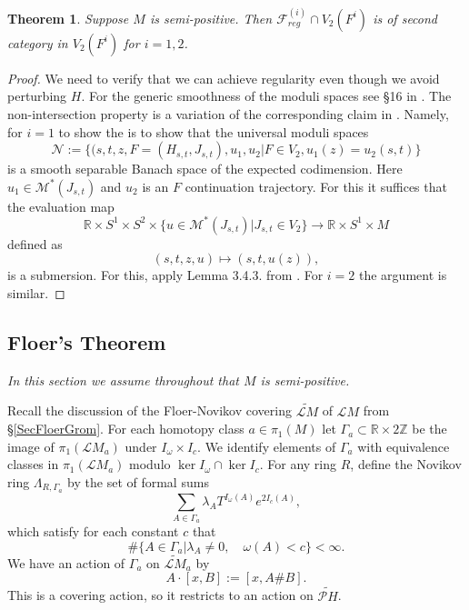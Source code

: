 \documentclass[11pt]{amsart}
\newcommand{\R}{\mathbb{R}}
\newcommand{\Z}{\mathbb{Z}}
\newtheorem{tm}{Theorem}[section]
\theoremstyle{definition}
\theoremstyle{remark}
\begin{document}
\begin{tm}\label{tmHoreg}
 Suppose $M$ is semi-positive. Then $\mathcal{F}^{(i)}_{reg}\cap V_2(F^i)$ is of second category in $V_2(F^i)$ for $i=1,2$.
\end{tm}
\begin{proof}
We need to verify that we can achieve regularity even though we avoid perturbing $H$. For the generic smoothness of the moduli spaces see \S16 in \cite{Ritter13}. The non-intersection property is a variation of the corresponding claim in \cite{HoferSalamon}. Namely, for $i=1$  to show the is to show that the universal moduli spaces
\[
\mathcal{N}:=\{(s,t,z ,F=(H_{s,t},J_{s,t}),u_1,u_2|F\in V_2, u_1(z)=u_2(s,t)\}
\]
is a smooth separable Banach space of the expected codimension. Here $u_1\in\mathcal{M}^*(J_{s,t})$ and $u_2$ is an $F$ continuation trajectory. For this it suffices that the evaluation map
\[
\R\times S^1\times S^2 \times\{u\in\mathcal{M}^*(J_{s,t})|J_{s,t}\in V_2\}\to \R\times S^1\times M
\]
defined as
\[
(s,t,z,u)\mapsto (s,t,u(z)),
\]
is a submersion. For this, apply Lemma 3.4.3. from \cite{MS2}. For $i=2$ the argument is similar.
\end{proof}

\subsection{Floer's Theorem}\label{SecDefHam}
 \textit{In this section we assume throughout that $M$ is semi-positive.}

Recall the discussion of the Floer-Novikov covering $\widetilde{\mathcal{L}M}$ of $\mathcal{L}M$ from \S\ref{SecFloerGrom}. For each homotopy class $a\in\pi_1(M)$  let $\Gamma_a\subset \R\times 2\Z$ be the image of $\pi_1(\mathcal{L}M_a)$ under $I_\omega\times I_c$.  We identify elements of $\Gamma_a$ with equivalence classes in $\pi_1(\mathcal{L}M_a)$  modulo $\ker I_\omega\cap\ker I_c$. For any ring $R$, define the Novikov ring $\Lambda_{R,\Gamma_a}$ by the set of formal sums
\[
\sum_{A\in\Gamma_a}\lambda_AT^{I_\omega(A)}e^{2I_c(A)},
\]
which satisfy for each constant $c$ that
\[
\#\{A\in\Gamma_a|\lambda_A\neq 0,\quad\omega(A)<c\}<\infty.
\]
We have an action of $\Gamma_a$ on $\widetilde{\mathcal{L}M}_a$ by
\[
A\cdot[x,B]:=[x,A\#B].
\]
This is a covering action, so it restricts to an action on $\widetilde{\mathcal{P}H}$.
\end{document}
